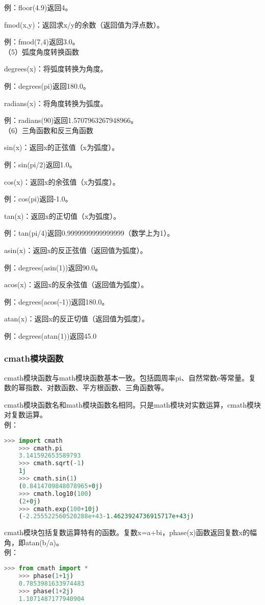 \documentclass[11pt,a4paper]{article}
\begin{document}
例：floor(4.9)返回4。

fmod(x,y)：返回求x/y的余数（返回值为浮点数）。

例：fmod(7,4)返回3.0。\\
（5）弧度角度转换函数

degrees(x)：将弧度转换为角度。

例：degrees(pi)返回180.0。

radians(x)：将角度转换为弧度。

例：radians(90)返回1.5707963267948966。\\
（6）三角函数和反三角函数

sin(x)：返回x的正弦值（x为弧度）。

例：sin(pi/2)返回1.0。

cos(x)：返回x的余弦值（x为弧度）。

例：cos(pi)返回-1.0。

tan(x)：返回x的正切值（x为弧度）。

例：tan(pi/4)返回0.9999999999999999（数学上为1）。

asin(x)：返回x的反正弦值（返回值为弧度）。

例：degrees(asin(1))返回90.0。

acos(x)：返回x的反余弦值（返回值为弧度）。

例：degrees(acos(-1))返回180.0。

atan(x)：返回x的反正切值（返回值为弧度）。

例：degrees(atan(1))返回45.0

\subsubsection{cmath模块函数}

cmath模块函数与math模块函数基本一致。包括圆周率pi、自然常数e等常量。复数的幂指数、对数函数、平方根函数、三角函数等。

cmath模块函数名和math模块函数名相同。只是math模块对实数运算，cmath模块对复数运算。\\
例：
\begin{lstlisting}[language={Python}]
    >>> import cmath
    >>> cmath.pi
    3.141592653589793
    >>> cmath.sqrt(-1)
    1j
    >>> cmath.sin(1)
    (0.8414709848078965+0j)
    >>> cmath.log10(100)
    (2+0j)
    >>> cmath.exp(100+10j)
    (-2.255522560520288e+43-1.4623924736915717e+43j)
\end{lstlisting}

cmath模块包括复数运算特有的函数。复数x=a+bi，phase(x)函数返回复数x的幅角，即atan(b/a)。\\
例：
\begin{lstlisting}[language={Python}]
    >>> from cmath import *
    >>> phase(1+1j)
    0.7853981633974483
    >>> phase(1+2j)
    1.1071487177940904
\end{lstlisting}
\end{document}
